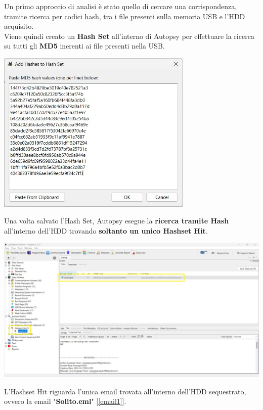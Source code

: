 Un primo approccio di analisi è stato quello di cercare una corrispondenza, tramite ricerca per codici hash, tra i file presenti sulla memoria USB e l'HDD acquisito.\vspace{14pt}\\
Viene quindi creato un \textbf{Hash Set} all'interno di Autopsy per effettuare la ricerca su tutti gli \textbf{MD5} inerenti ai file presenti nella USB.
\begin{center}
    \includegraphics[width=0.7\textwidth]{img/hash-list.jpeg}
\end{center}
Una volta salvato l'Hash Set, Autopsy esegue la \textbf{ricerca tramite Hash} all'interno dell'HDD trovando \textbf{soltanto un unico Hashset Hit}.
\begin{center}
    \includegraphics[width=1\textwidth]{img/hash-result.jpeg}
\end{center}
L'Hashset Hit riguarda l'unica email trovata all'interno dell'HDD sequestrato, ovvero la email "\textbf{Solito.eml}" [\ref{email1}].